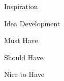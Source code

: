 

\subtitle{Konzeptpräsentation}



\slidetitle


\begin{frame}{Inspiration}
\end{frame}

\begin{frame}{Idea Development}
\end{frame}

\begin{frame}{Must Have}
\end{frame}

\begin{frame}{Should Have}
\end{frame}

\begin{frame}{Nice to Have}
\end{frame}

%

